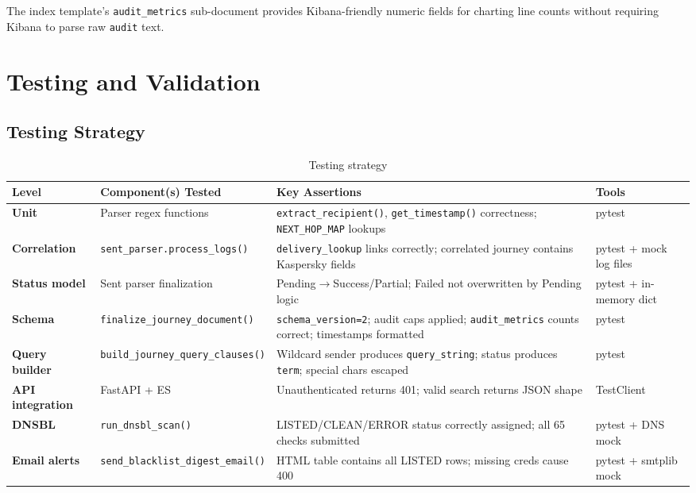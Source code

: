\documentclass[12pt,a4paper,oneside]{report}
\newcommand{\rowA}{\rowcolor{rowgray}}
\begin{document}
The index template's \texttt{audit\_metrics} sub-document provides Kibana-friendly numeric fields for charting line counts without requiring Kibana to parse raw \texttt{audit} text.

\section{Testing and Validation}

\subsection{Testing Strategy}

\begin{table}[H]
\centering
\caption{Testing strategy}
\label{tab:testing-e4}
\begin{tabularx}{\textwidth}{@{}>{\bfseries}p{2.8cm} X X p{2.4cm}@{}}
\toprule
Level & Component(s) Tested & Key Assertions & Tools \\
\midrule
\rowA Unit & Parser regex functions & \texttt{extract\_recipient()}, \texttt{get\_timestamp()} correctness; \texttt{NEXT\_HOP\_MAP} lookups & pytest \\
Correlation & \texttt{sent\_parser.process\_logs()} & \texttt{delivery\_lookup} links correctly; correlated journey contains Kaspersky fields & pytest + mock log files \\
\rowA Status model & Sent parser finalization & Pending$\to$Success/Partial; Failed not overwritten by Pending logic & pytest + in-memory dict \\
Schema & \texttt{finalize\_journey\_document()} & \texttt{schema\_version=2}; audit caps applied; \texttt{audit\_metrics} counts correct; timestamps formatted & pytest \\
\rowA Query builder & \texttt{build\_journey\_query\_clauses()} & Wildcard sender produces \texttt{query\_string}; status produces \texttt{term}; special chars escaped & pytest \\
API integration & FastAPI + ES & Unauthenticated returns 401; valid search returns JSON shape & TestClient \\
\rowA DNSBL & \texttt{run\_dnsbl\_scan()} & LISTED/CLEAN/ERROR status correctly assigned; all 65 checks submitted & pytest + DNS mock \\
Email alerts & \texttt{send\_blacklist\_digest\_email()} & HTML table contains all LISTED rows; missing creds cause 400 & pytest + smtplib mock \\
\bottomrule
\end{tabularx}
\end{table}
\end{document}
